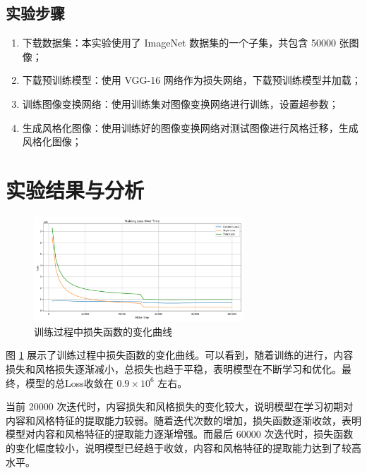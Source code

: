 \documentclass{article}
\begin{document}
\subsection{实验步骤}

\begin{enumerate}[noitemsep]
    \item 下载数据集：本实验使用了 ImageNet \cite{deng2009imagenet} 数据集的一个子集，共包含 50000 张图像；
    \item 下载预训练模型：使用 VGG-16 网络作为损失网络，下载预训练模型并加载；
    \item 训练图像变换网络：使用训练集对图像变换网络进行训练，设置超参数；
    \item 生成风格化图像：使用训练好的图像变换网络对测试图像进行风格迁移，生成风格化图像；
\end{enumerate}

\section{实验结果与分析}

\begin{figure}[H]
\centering
\includegraphics[width=0.7\textwidth]{img/loss_1.png}
\caption{训练过程中损失函数的变化曲线}
\label{fig:loss}
\end{figure}

图 \ref{fig:loss} 展示了训练过程中损失函数的变化曲线。可以看到，随着训练的进行，内容损失和风格损失逐渐减小，总损失也趋于平稳，表明模型在不断学习和优化。最终，模型的总Loss收敛在 $0.9 \times 10^6$ 左右。

当前 20000 次迭代时，内容损失和风格损失的变化较大，说明模型在学习初期对内容和风格特征的提取能力较弱。随着迭代次数的增加，损失函数逐渐收敛，表明模型对内容和风格特征的提取能力逐渐增强。而最后 60000 次迭代时，损失函数的变化幅度较小，说明模型已经趋于收敛，内容和风格特征的提取能力达到了较高水平。
\end{document}
